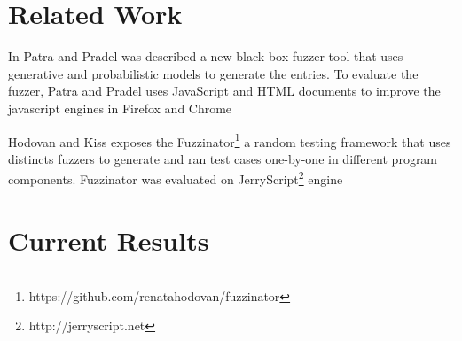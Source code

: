 \documentclass[11pt]{article}
\newcommand{\Fix}[1]{\textbf{[[}{\color{red} #1}\textbf{]]}}
\newcommand{\Mar}[1]{\textbf{[[}{\color{blue} #1}\textbf{]]}}
\newcommand{\MAB}[1]{\textbf{[[}{\color{darkgreen} #1}\textbf{]]}}
\begin{document}
\section{Related Work}

In Patra and Pradel \cite{patra2016learning} was described a new black-box fuzzer tool 
that uses generative and probabilistic models to generate the entries. To evaluate the fuzzer,
Patra and Pradel uses JavaScript and HTML documents to improve the javascript engines
in Firefox and Chrome


Hodovan and Kiss \cite{hodovan-fuzzinator} exposes the Fuzzinator\footnote{https://github.com/renatahodovan/fuzzinator}
a random testing framework that uses distincts fuzzers to generate and ran test cases one-by-one in different
program components. Fuzzinator was evaluated on JerryScript\footnote{http://jerryscript.net} 
engine


\section{Current Results}
\label{sec:results}
\end{document}
